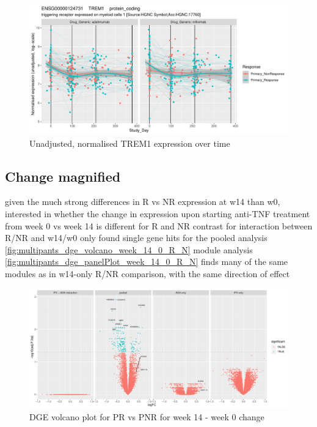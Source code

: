 \begin{outline}

\begin{figure}
    \centering
    \includegraphics[width=1.0\textwidth,page=1]{mainmatter/figures/chapter_04/dream.E_vs_Study_Day.GENEID_ENSG00000124731.SYMBOL_TREM1.pdf}
    \caption{Unadjusted, normalised TREM1 expression over time}
    \label{fig:multipants_dge_TREM1}
\end{figure}

\subsection{Change magnified}

\1 given the much strong differences in R vs NR expression at w14 than w0, interested in whether the change in expression upon starting anti-TNF treatment from week 0 vs week 14 is different for R and NR
    \2 contrast for interaction between R/NR and w14/w0
    \2 only found single gene hits for the pooled analysis \autoref{fig:multipants_dge_volcano_week_14_0_R_N}
    \2 module analysis \autoref{fig:multipants_dge_panelPlot_week_14_0_R_N}
        \3 finds many of the same modules as in w14-only R/NR comparison, with the same direction of effect

\begin{figure}
    \centering
    \includegraphics[width=1.0\textwidth,page=1]{mainmatter/figures/chapter_04/plot_gene_set_enrichment.dge_result_volcano_C_(3RI_1RI)_(3NI_1NI),C_(3RA_1RA)_(3NA_1NA),C_((3RI_1RI)_(3NI_1NI))_((3RA_1RA)_(3NA_1NA)),C_(3R_1R)_(3N_1N).pdf}
    \caption{DGE volcano plot for PR vs PNR for week 14 - week 0 change}
    \label{fig:multipants_dge_volcano_week_14_0_R_N}
\end{figure}


\end{outline}
